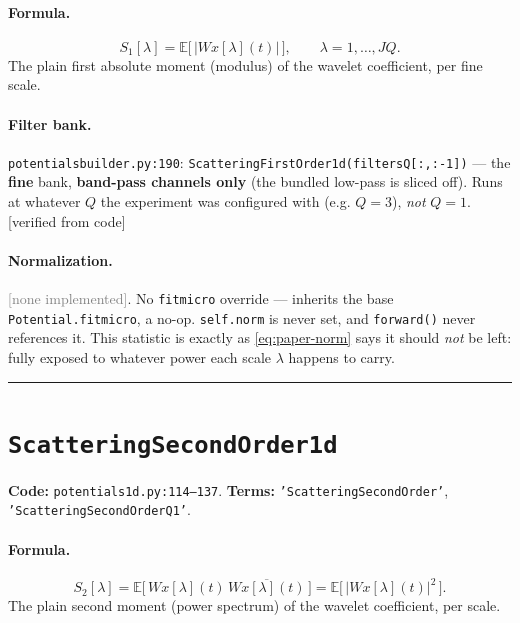 \documentclass[11pt]{article}
\newcommand{\E}{\mathbb{E}}
\newcommand{\Wx}{W\!x}
\newcommand{\code}[1]{\texttt{#1}}
\renewcommand{\_}{\origunderscore\allowbreak} %
\newcommand{\verified}{\textcolor{blue!50!black}{[verified from code]}}
\newcommand{\none}{\textcolor{gray}{[none implemented]}}
\begin{document}
\paragraph{Formula.}
\begin{equation}
  S_1[\lambda] = \E\big[\,|\Wx[\lambda](t)|\,\big], \qquad \lambda = 1,\dots,JQ.
\end{equation}
The plain first absolute moment (modulus) of the wavelet coefficient, per fine scale.

\paragraph{Filter bank.} \code{potentials\_builder.py:190}: \code{Scattering\_First\_Order\_1d(filters\_Q[:,:-1])}
— the \textbf{fine} bank, \textbf{band-pass channels only} (the bundled low-pass
is sliced off). Runs at whatever $Q$ the experiment was configured with (e.g.
$Q=3$), \emph{not} $Q=1$. \verified

\paragraph{Normalization.} \none. No \code{fit\_micro} override — inherits the
base \code{Potential.fit\_micro}, a no-op. \code{self.norm} is never set, and
\code{forward()} never references it. This statistic is exactly as
\eqref{eq:paper-norm} says it should \emph{not} be left: fully exposed to
whatever power each scale $\lambda$ happens to carry.

\bigskip
\hrule
\bigskip

\section{\code{Scattering\_Second\_Order\_1d}}
\textbf{Code:} \code{potentials\_1d.py:114--137}. \quad
\textbf{Terms:} \code{'Scattering\_Second\_Order'}, \code{'Scattering\_Second\_Order\_Q1'}.

\paragraph{Formula.}
\begin{equation}
  S_2[\lambda] = \E\big[\,\Wx[\lambda](t)\,\overline{\Wx[\lambda](t)}\,\big]
              = \E\big[\,|\Wx[\lambda](t)|^2\,\big].
\end{equation}
The plain second moment (power spectrum) of the wavelet coefficient, per scale.
\end{document}
